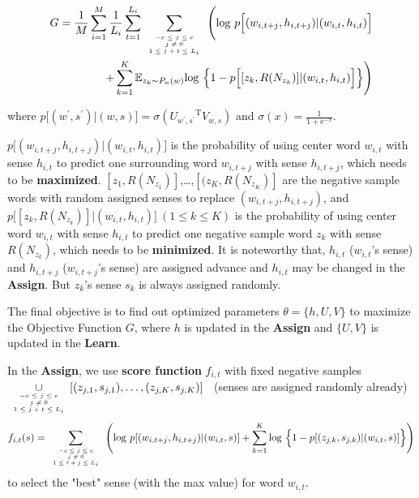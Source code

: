 \begin{equation}
\begin{split}
G = \frac{1}{M}\sum_{i=1}^M\frac{1}{L_i}\sum_{t=1}^{L_i}\sum\limits_{\mbox{\tiny$\begin{array}{c}-c\leq j \leq c\\ j\neq 0\\ 1\leq j+t\leq L_i\end{array}$}}\Bigg (\mathrm{log}\ p\Big [(w_{i,t+j},h_{i,t+j})|(w_{i,t},h_{i,t})\Big ] \\
+\sum\limits_{k=1}^K\mathbb{E}_{z_k\sim P_n(w)}\mathrm{log}\ \Big \{1-p\Big[[z_k,R(N_{z_k})]|(w_{i,t},h_{i,t})\Big ] \Big \} \Bigg )
\end{split}
\end{equation} 

where $p\Big[(w^\prime,s^\prime)|(w,s)\Big] = \sigma({U_{w^\prime,s^\prime}}^{\mathrm{T}}V_{w,s})$
 and $\sigma(x) = \frac{1}{1+\mathrm{e}^{-x}}$. 
 
 $p\Big [(w_{i,t+j},h_{i,t+j})|(w_{i,t},h_{i,t})\Big ]$ is the probability of using center word $w_{i,t}$ with sense $h_{i,t}$ to predict one surrounding word $w_{i,t+j}$ with sense $h_{i,t+j}$, which needs to be \textbf{maximized}.
$[z_1,R(N_{z_1})]$,\ldots,$[(z_K,R(N_{z_K})]$ are the negative sample words with random assigned senses to replace $(w_{i,t+j},h_{i,t+j})$, and $p\Big[[z_k,R(N_{z_k})]|(w_{i,t},h_{i,t})\Big ]\ (1\leq k\leq K)$ is the probability of using center word $w_{i,t}$ with sense $h_{i,t}$ to predict one negative sample word $z_k$ with sense $R(N_{z_k})$, which needs to be \textbf{minimized}. 
It is noteworthy that, $h_{i,t}$  ($w_{i,t}$'s sense) and $h_{i,t+j}$ ($w_{i,t+j}$'s sense) are assigned advance and $h_{i,t}$ may be changed in the \textbf{Assign}. But $z_k$'s sense $s_k$ is always assigned randomly. 

The final objective is to find out optimized parameters $\theta = \{h,U,V\}$ to maximize the Objective Function $G$, where $h$ is updated in the \textbf{Assign} and $\{U,V\}$ is updated in the \textbf{Learn}.

In the \textbf{Assign}, we use \textbf{score function} $f_{i,t}$ with fixed negative samples\\
 $\displaystyle{\mathop{\cup}_{\mbox{\tiny$\begin{array}{c}-c\leq j \leq c\\ j\neq 0\\ 1\leq j+t\leq L_i\end{array}$}}}[(z_{j,1},s_{j,1}),\ldots,(z_{j,K},s_{j,K})]$ \ (senses are assigned randomly already)
$$f_{i,t}(s) = \sum\limits_{\mbox{\tiny$\begin{array}{c}-c\leq j \leq c\\ j\neq 0\\ 1\leq t+j\leq L_i\end{array}$}}\Bigg (\mathrm{log}\ p[(w_{i,t+j},h_{i,t+j})|(w_{i,t},s) ]+\sum\limits_{k=1}^K\mathrm{log}\ \Big \{1-p[(z_{j,k},s_{j,k})|(w_{i,t},s)] \Big \} \Bigg )$$ 
to select the "best" sense (with the max value) for word $w_{i,t}$. 

